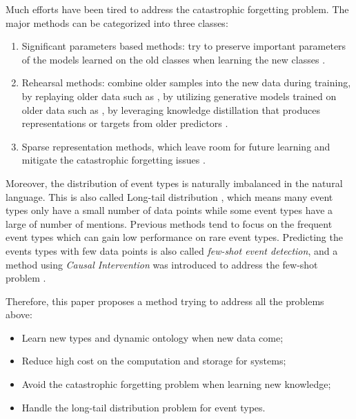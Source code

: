 Much efforts have been tired to address the catastrophic forgetting problem. The major methods can be categorized into three classes: 
\begin{enumerate}
  \item Significant parameters based methods: try to preserve important parameters of the models learned on the old classes when learning the new classes \citep{kirkpatrick2017overcoming, aljundi2018memory}.
  \item Rehearsal methods: combine older samples into the new data during training, by replaying older data such as \citet{rebuffi2017icarl, hou2019learning}, by utilizing generative models trained on older data such as \citet{shin2017continual}, by leveraging knowledge distillation that produces representations or targets from older predictors \citep{li2017learning, cao2020incremental}.
  \item Sparse representation methods, which leave room for future learning and mitigate the catastrophic forgetting issues \citep{liu2019utility, aljundi2018selfless}.
\end{enumerate}

Moreover, the distribution of event types is naturally imbalanced in the natural language. This is also called Long-tail distribution \citep{yu2021lifelong}, which means many event types only have a small number of data points while some event types have a large of number of mentions. Previous methods \citep{nguyen2016two, cao2020incremental} tend to focus on the frequent event types which can gain low performance on rare event types. Predicting the events types with few data points is also called \textit{few-shot event detection}, and a method using \textit{Causal Intervention} was introduced to address the few-shot problem \citep{chen2021honey}.

Therefore, this paper proposes a method trying to address all the problems above:
\begin{itemize}
  \item Learn new types and dynamic ontology when new data come;
  \item Reduce high cost on the computation and storage for systems;
  \item Avoid the catastrophic forgetting problem when learning new knowledge;
  \item Handle the long-tail distribution problem for event types.
\end{itemize}

